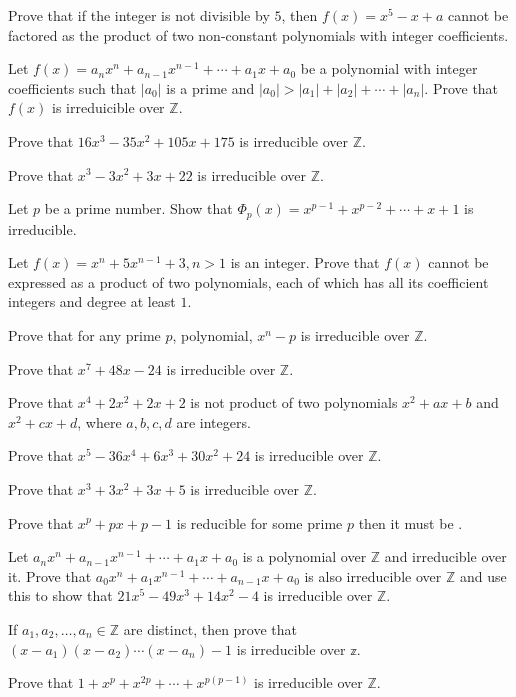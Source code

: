 \item Prove that if the integer  is not divisible by $5$, then $f(x) = x^5 - x + a$ cannot be
  factored as the product of two non-constant polynomials with integer coefficients.
\item Let $f(x) = a_nx^n + a_{n - 1}x^{n -1} + \cdots + a_1x + a_0$ be a polynomial with integer
  coefficients such that $|a_0|$ is a prime and $|a_0| > |a_1| + |a_2| + \cdots + |a_n|$. Prove that $f(x)$
  is irreduicible over $\mathbb{Z}$.
\item Prove that $16x^3 - 35x^2 + 105x + 175$ is irreducible over $\mathbb{Z}$.
\item Prove that $x^3 - 3x^2 + 3x + 22$ is irreducible over $\mathbb{Z}$.
\item Let $p$ be a prime number. Show that $\Phi_p(x) = x^{p - 1} + x^{p - 2} + \cdots + x + 1$ is
  irreducible.
\item Let $f(x) = x^n + 5x^{n - 1} + 3, n > 1$ is an integer. Prove that $f(x)$ cannot be expressed as a
  product of two polynomials, each of which has all its coefficient integers and degree at least $1$.
\item Prove that for any prime $p$, polynomial, $x^n - p$ is irreducible over $\mathbb{Z}$.
\item Prove that $x^7 + 48x - 24$ is irreducible over $\mathbb{Z}$.
\item Prove that $x^4 + 2x^2 + 2x + 2$ is not product of two polynomials $x^2 + ax + b$ and $x^2 + cx + d$,
  where $a, b, c, d$ are integers.
\item Prove that $x^5 - 36x^4 + 6x^3 + 30x^2 + 24$ is irreducible over $\mathbb{Z}$.
\item Prove that $x^3 + 3x^2 + 3x + 5$ is irreducible over $\mathbb{Z}$.
\item Prove that $x^p + px + p - 1$ is reducible for some prime $p$ then it must be .
\item Let $a_nx^n + a_{n - 1}x^{n - 1} + \cdots + a_1x + a_0$ is a polynomial over $\mathbb{Z}$ and
  irreducible over it. Prove that $a_0x^n + a_1x^{n - 1} + \cdots + a_{n - 1}x + a_0$ is also irreducible
  over $\mathbb{Z}$ and use this to show that $21x^5 - 49x^3 + 14x^2 - 4$ is irreducible over $\mathbb{Z}$.
\item If $a_1, a_2, \ldots, a_n\in\mathbb{Z}$ are distinct, then prove that $(x - a_1)(x - a_2)\cdots(x -
  a_n) - 1$ is irreducible over $\mathbb{z}$.
\item Prove that $1 + x^p + x^{2p} + \cdots + x^{p(p - 1)}$ is irreducible over $\mathbb{Z}$.
